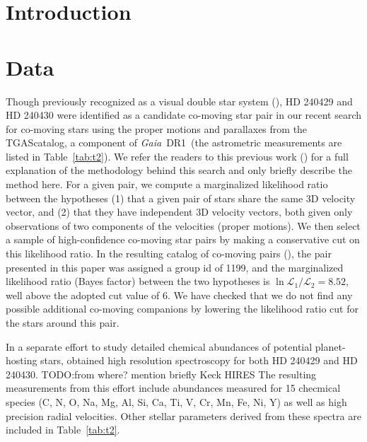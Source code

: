 \documentclass[manuscript]{aastex6}
\newcommand{\project}[1]{\textsl{#1}}
\newcommand{\acronym}[1]{{\small{#1}}}
\newcommand{\gaia}{\project{Gaia}}
\newcommand{\dr}{\acronym{DR1}}
\newcommand{\tgas}{\acronym{TGAS}}
\newcommand{\todo}[1]{{\color{blue}TODO:#1}}
\renewcommand\tablename{Table}
\begin{document}
\section{Introduction} %
\label{sec:introduction}


\section{Data}
\label{sec:data}

Though previously recognized as a visual double star system
(\citealt{2001AJ....122.3466M}), HD 240429 and HD 240430 were identified as a
candidate co-moving star pair in our recent search for co-moving stars using the
proper motions and parallaxes from the \tgas catalog, a component of \gaia\ \dr\
(the astrometric measurements are listed in \tablename~\ref{tab:t2}).
We refer the readers to this previous work (\citealt{2016arXiv161202440O}) for a
full explanation of the methodology behind this search and only briefly describe
the method here.
For a given pair, we compute a marginalized likelihood ratio between the
hypotheses (1) that a given pair of stars share the same 3D velocity vector, and
(2) that they have independent 3D velocity vectors, both given only observations
of two components of the velocities (proper motions).
We then select a sample of high-confidence co-moving star pairs by making a
conservative cut on this likelihood ratio.
In the resulting catalog of co-moving pairs (\citealt{2016arXiv161202440O}),
the pair presented in this paper was assigned a group id of 1199,
and the marginalized likelihood ratio (Bayes factor)
between the two hypotheses is $\ln{\mathcal{L}_1/\mathcal{L}_2} = 8.52$,
well above the adopted cut value of 6.
We have checked that we do not find any possible additional co-moving companions
by lowering the likelihood ratio cut for the stars around this pair.

In a separate effort to study detailed chemical abundances of
potential planet-hosting stars, \citet{2016ApJS..225...32B}
obtained high resolution spectroscopy for both HD 240429 and HD 240430.
\todo{from where? mention briefly Keck HIRES}
The resulting measurements from this effort include abundances measured for 15
checmical species (C, N, O, Na, Mg, Al, Si, Ca, Ti, V, Cr, Mn, Fe, Ni, Y) as
well as high precision radial velocities.
Other stellar parameters derived from these spectra are included in
\tablename~\ref{tab:t2}.
\end{document}
